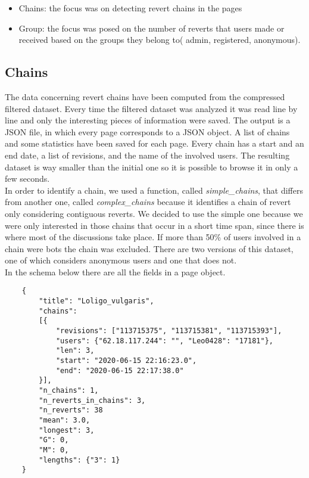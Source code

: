 \begin{itemize}
    \item Chains:  the focus was on detecting revert chains in the pages 
    \item Group:  the focus was posed on the number of reverts that users made or received based on the groups they belong to( admin, registered, anonymous).
\end{itemize}

\subsection{Chains}
The data concerning revert chains have been computed from the compressed filtered dataset. Every
time the filtered dataset was analyzed it was read line by line and only the interesting
pieces of information were saved. The output is a JSON file, in which every page corresponds to a JSON object.
A list of chains and some statistics have been saved for each page. Every chain has a start and an end date, a
list of revisions, and the name of the involved users. The resulting dataset is way smaller than the initial one so it is
possible to browse it in only a few seconds.\\


In order to identify a chain, we used a function, called \textit{simple\_chains}, that differs from
another one, called \textit{complex\_chains} because it identifies a chain of revert only
considering contiguous reverts. We decided to use the simple one because we were only interested in
those chains that occur in a short time span, since there is where most of the discussions take place.
If more than 50\% of users involved in a chain were bots the chain was excluded. There are two
versions of this dataset, one of which considers anonymous users and one that does not. \\

In the schema below there are all the fields in a page object. 
\begin{verbatim}
    {
        "title": "Loligo_vulgaris", 
        "chains": 
        [{
            "revisions": ["113715375", "113715381", "113715393"], 
            "users": {"62.18.117.244": "", "Leo0428": "17181"}, 
            "len": 3, 
            "start": "2020-06-15 22:16:23.0", 
            "end": "2020-06-15 22:17:38.0"
        }], 
        "n_chains": 1, 
        "n_reverts_in_chains": 3, 
        "n_reverts": 38
        "mean": 3.0, 
        "longest": 3, 
        "G": 0,
        "M": 0, 
        "lengths": {"3": 1}
    }
    
\end{verbatim}


